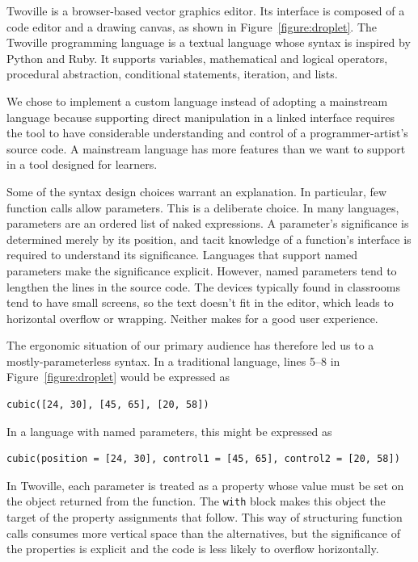 \label{section:language}

Twoville is a browser-based vector graphics editor. Its interface is composed of a code editor and a drawing canvas, as shown in Figure~\ref{figure:droplet}. The Twoville programming language is a textual language whose syntax is inspired by Python and Ruby. It supports variables, mathematical and logical operators, procedural abstraction, conditional statements, iteration, and lists.

We chose to implement a custom language instead of adopting a mainstream language because supporting direct manipulation in a linked interface requires the tool to have considerable understanding and control of a programmer-artist's source code. A mainstream language has more features than we want to support in a tool designed for learners. 

Some of the syntax design choices warrant an explanation. In particular, few function calls allow parameters. This is a deliberate choice. In many languages, parameters are an ordered list of naked expressions. A parameter's significance is determined merely by its position, and tacit knowledge of a function's interface is required to understand its significance. Languages that support named parameters make the significance explicit. However, named parameters tend to lengthen the lines in the source code. The devices typically found in classrooms tend to have small screens, so the text doesn't fit in the editor, which leads to horizontal overflow or wrapping. Neither makes for a good user experience.

The ergonomic situation of our primary audience has therefore led us to a mostly-parameterless syntax. In a traditional language, lines 5--8 in Figure~\ref{figure:droplet} would be expressed as
\begin{verbatim}
cubic([24, 30], [45, 65], [20, 58])
\end{verbatim}
In a language with named parameters, this might be expressed as
\begin{verbatim}
cubic(position = [24, 30], control1 = [45, 65], control2 = [20, 58])
\end{verbatim}
In Twoville, each parameter is treated as a property whose value must be set on the object returned from the function. The \verb=with= block makes this object the target of the property assignments that follow. This way of structuring function calls consumes more vertical space than the alternatives, but the significance of the properties is explicit and the code is less likely to overflow horizontally.


